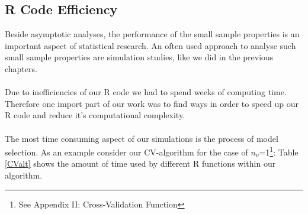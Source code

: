 \documentclass[Research_Module_ES.tex]{subfiles}
\begin{document}
\subsection{R Code Efficiency}
Beside asymptotic analyses, the performance of the small sample properties is an important aspect of statistical research. An often used approach to analyse such small sample properties are simulation studies, like we did in the previous chapters.\\
\\
Due to inefficiencies of our R code we had to spend weeks of computing time. Therefore one import part of our work was to find ways in order to speed up our R code and reduce it's computational complexity.\\
\\
The most time consuming aspect of our simulations is the process of model selection. As an example consider our CV-algorithm for the case of $n_\nu$=1\footnote{See Appendix II: Cross-Validation Function}: Table \ref{CValt} shows the amount of time used by different R functions within our algorithm.\\
\end{document}
